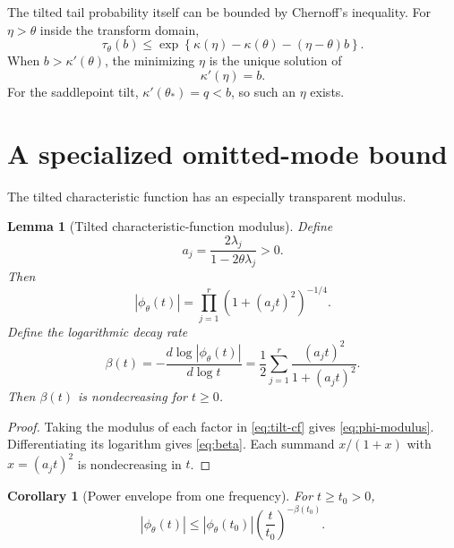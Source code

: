 \documentclass[11pt]{article}
\newtheorem{lemma}[theorem]{Lemma}
\newtheorem{corollary}[theorem]{Corollary}
\theoremstyle{definition}
\begin{document}
The tilted tail probability itself can be bounded by Chernoff's inequality. For $\eta>\theta$ inside the transform domain,
\begin{equation}
\tau_{\theta}(b)
\le
\exp\left\{
\kappa(\eta)-\kappa(\theta)-(\eta-\theta)b
\right\}.
\label{eq:tilted-chernoff}
\end{equation}
When $b>\kappa'(\theta)$, the minimizing $\eta$ is the unique solution of
\begin{equation}
\kappa'(\eta)=b.
\label{eq:eta}
\end{equation}
For the saddlepoint tilt, $\kappa'(\theta_*)=q<b$, so such an $\eta$ exists.

\section{A specialized omitted-mode bound}

The tilted characteristic function has an especially transparent modulus.

\begin{lemma}[Tilted characteristic-function modulus]
\label{lem:modulus}
Define
\begin{equation}
a_j=\frac{2\lambda_j}{1-2\theta\lambda_j}>0.
\label{eq:aj}
\end{equation}
Then
\begin{equation}
|\phi_{\theta}(t)|
=\prod_{j=1}^{r}\left(1+(a_jt)^2\right)^{-1/4}.
\label{eq:phi-modulus}
\end{equation}
Define the logarithmic decay rate
\begin{equation}
\beta(t)
=-\frac{d\log|\phi_{\theta}(t)|}{d\log t}
=\frac12\sum_{j=1}^{r}
\frac{(a_jt)^2}{1+(a_jt)^2}.
\label{eq:beta}
\end{equation}
Then $\beta(t)$ is nondecreasing for $t\ge0$.
\end{lemma}

\begin{proof}
Taking the modulus of each factor in \eqref{eq:tilt-cf} gives \eqref{eq:phi-modulus}. Differentiating its logarithm gives \eqref{eq:beta}. Each summand $x/(1+x)$ with $x=(a_jt)^2$ is nondecreasing in $t$.
\end{proof}

\begin{corollary}[Power envelope from one frequency]
\label{cor:power-envelope}
For $t\ge t_0>0$,
\begin{equation}
|\phi_{\theta}(t)|
\le
|\phi_{\theta}(t_0)|
\left(\frac{t}{t_0}\right)^{-\beta(t_0)}.
\label{eq:power-envelope}
\end{equation}
\end{corollary}
\end{document}
